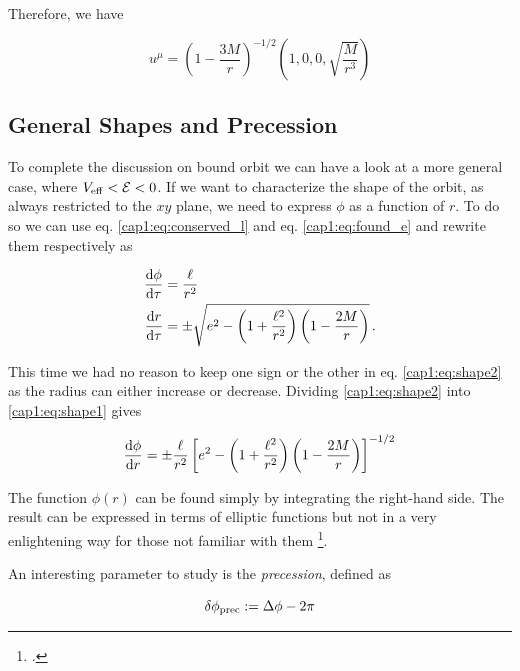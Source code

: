 Therefore, we have

\begin{equation}
    u^\mu = \left( 1 - \frac{3M}{r} \right)^{-1/2}
    \left( 1, 0, 0, \sqrt{\frac{M}{r^3}} \right)
\end{equation}


\subsection{General Shapes and Precession}
\label{cap1:sec:precession}

To complete the discussion on bound orbit we can have a look at a more general
case, where $V_{\rm eff} < \mathcal E < 0$.
If we want to characterize the shape of the orbit, as always restricted to the
$xy$ plane, we need to express $\phi$ as a function of $r$.
To do so we can use eq. \ref{cap1:eq:conserved_l} and eq. \ref{cap1:eq:found_e}
and rewrite them respectively as

\begin{subequations}
\begin{align}
    \dv{\phi}{\tau} &= \frac{\ell}{r^2} \label{cap1:eq:shape1} \\
    \dv{r}{\tau} &= \pm \sqrt{e^2 - \left(1 + \frac{\ell^2}{r^2}\right)
    \left(1 - \frac{2M}{r}\right)} \label{cap1:eq:shape2} \, .
\end{align}
\label{cap1:eq:to_find_shape}
\end{subequations}

This time we had no reason to keep one sign or the other in eq.
\ref{cap1:eq:shape2} as the radius can either increase or decrease.
Dividing \ref{cap1:eq:shape2} into \ref{cap1:eq:shape1} gives

\begin{equation}
    \dv{\phi}{r} = \pm \frac{\ell}{r^2}
    \left[e^2 - \left(1 + \frac{\ell^2}{r^2}\right)
    \left(1 - \frac{2M}{r}\right)\right]^{-1/2}
    \label{cap1:eq:shape}
\end{equation}

The function $\phi(r)$ can be found simply by integrating the right-hand side.
The result can be expressed in terms of elliptic functions but not in a very
enlightening way for those not familiar with them
\footcite[page 202]{hartle2021gravity}.

An interesting parameter to study is the \textit{precession}, defined as

\begin{equation}
    \delta \phi_{\rm prec} := \Delta \phi - 2 \pi
    \label{cap1:eq:precession}
\end{equation}

